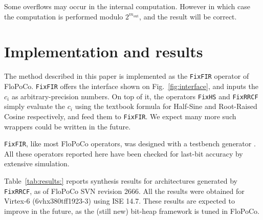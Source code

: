 \documentclass[twocolumn]{IEEEtran}
\newcommand{\abserr}{\varepsilon}
\newcommand{\maxerr}{\bound{\abserr}}
\newcommand{\bound}[1]{\overline{#1}}
\newcommand{\wcpg}[1]{||#1||}
\newcommand{\wcpgHe}{\wcpg{\mathcal{H}_\abserr}}
\begin{document}
Some overflows may occur in the internal computation. 
However in which case the computation is performed modulo $2^{m_{\text{out}}}$, and the result will be correct.
















\section{Implementation and results}

The method described in this paper is implemented as the \texttt{FixFIR} operator of FloPoCo. 
\texttt{FixFIR} offers the interface shown on Fig.~\ref{fig:interface}, and inputs the $c_i$ as arbitrary-precision numbers.
On top of it, the operators \texttt{FixHS} and \texttt{FixRRCF} simply evaluate the $c_i$ using the textbook formula for Half-Sine and Root-Raised Cosine respectively,  and feed them to \texttt{FixFIR}.  
We expect many more such wrappers could be written in the future.

\texttt{FixFIR}, like most FloPoCo operators, was designed with a testbench generator \cite{DinechinPasca2011-DaT}. 
All these operators reported here have been checked for last-bit accuracy by extensive simulation.

Table~\ref{tab:results:} reports synthesis results for architectures generated by \texttt{FixRRCF}, as of  FloPoCo SVN revision 2666. 
All the results were obtained for Virtex-6 (6vhx380tff1923-3)   using ISE 14.7.
These results are expected to  improve in the future, as the (still new) bit-heap framework is tuned in FloPoCo.  
\end{document}
